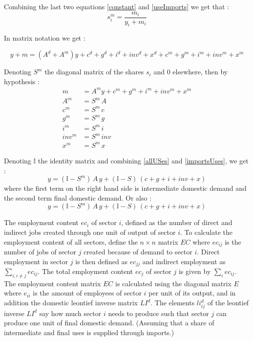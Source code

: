 \documentclass[12pt,english]{article}
\begin{document}
Combining the last two equations \ref{constant} and \ref{useImports} we get that :
\begin{equation}
s^m_i = \frac{m_i}{y_i + m_i} \label{share}
\end{equation}

In matrix notation we get :

\begin{equation}
y + m = (A^d + A^m ) y + c^d + g^d + i^d + inv^d + x^d +  c^m + g^m + i^m + inv^m + x^m \label{allUSes}
\end{equation}

Denoting $S^m$ the diagonal matrix of the shares $s_i$ and 0 elsewhere, then by hypothesis :
\begin{align}
m &= A^m  y +  c^m + g^m + i^m + inv^m + x^m \label{importsUses} \\
A^m &= S^m \, A \\
c^m &= S^m \, c \\
g^m &= S^m \, g \\
i^m &= S^m \, i \\
inv^m &= S^m \, inv \\
x^m &= S^m \, x 
\end{align}

Denoting $\mathbb{I}$ the identity matrix and combining \ref{allUSes} and \ref{importsUses}, we get :
\begin{equation}
y  = (\mathbb{I} - S^m)\, A \, y + (\mathbb{I} - S)\, (c + g + i + inv + x)  \label{IO1}
\end{equation}
where the first term on the right hand side is intermediate domestic demand and the second term final domestic demand. Or also :
\begin{equation}
y  = (\mathbb{I} - S^m)\, A \, y + (\mathbb{I} - S)\, (c + g + i + inv + x)  \label{IO2}
\end{equation}

The employment content $ec_i$ of sector $i$, defined as the number of direct and indirect jobs created through one unit of output of sector $i$. To calculate the employment content of all sectors, define the $n \times n$ matrix $EC$ where $ec_{ij}$  is the number of jobs of sector $j$ created because of demand to sector $i$. Direct employment in sector $j$ is then defined as $ec_{jj}$ and indirect employment as $\sum_{i, i\neq j} ec_{ij}$. The total employment content $ec_j$ of sector $j$ is given by $\sum_i ec_{ij}$. The employment content matrix $EC$ is calculated using the diagonal matrix $E$ where $e_{ii}$ is the amount of employees of sector $i$ per unit of its output, and in addition the domestic leontief inverse matrix $LI^d$. The elements $li_{ij}^d$ of the leontief inverse $LI^d$ say how much sector $i$ needs to produce such that sector $j$ can produce one unit of final domestic demand. (Assuming that a share of intermediate and final uses is supplied through imports.)
\end{document}
